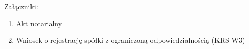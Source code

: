 \documentclass[a4paper,12pt,oneside]{article}
\begin{document}
	\tableofcontents
	
	
	
	
	
	
	
	Załączniki:
	\begin{enumerate}[label=Załącznik \arabic*]
		\item Akt notarialny
		\item Wniosek o rejestrację spółki z ograniczoną odpowiedzialnością (KRS-W3) 
	\end{enumerate}
	
	
	
\end{document}

